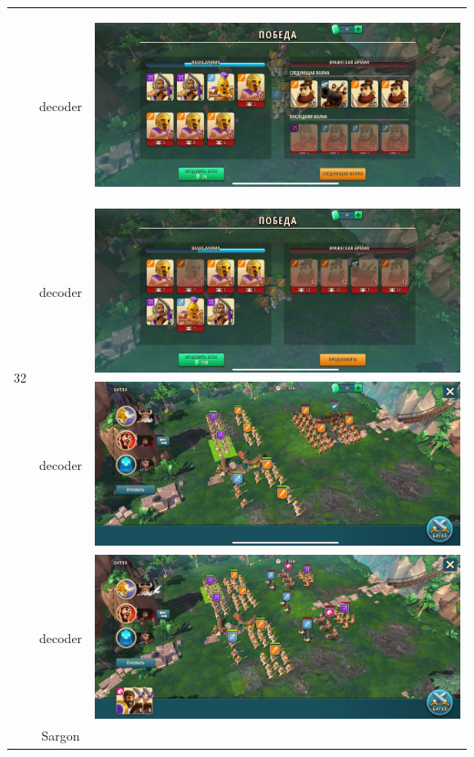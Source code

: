 \begin{longtable}{|c|c|c|}
    \hline
    \multirow{8}{*}{32} & decoder &
    \hypertarget{fight32}{\includegraphics[width=0.75\linewidth]{./parts/media/TreasureHunt/32/decoder/photo_2022-04-07_10-01-48.jpg}} \\
    & decoder &
    \includegraphics[width=0.75\linewidth]{./parts/media/TreasureHunt/32/decoder/photo_2022-04-07_10-01-57.jpg} \\
    & decoder &
    \includegraphics[width=0.75\linewidth]{./parts/media/TreasureHunt/32/decoder/photo_2022-04-07_10-01-54.jpg} \\
    & decoder &
    \includegraphics[width=0.75\linewidth]{./parts/media/TreasureHunt/32/decoder/photo_2022-04-07_10-00-59.jpg} \\
    \hline
    \multirow{8}{*}{32} & Sargon &

\end{longtable}

